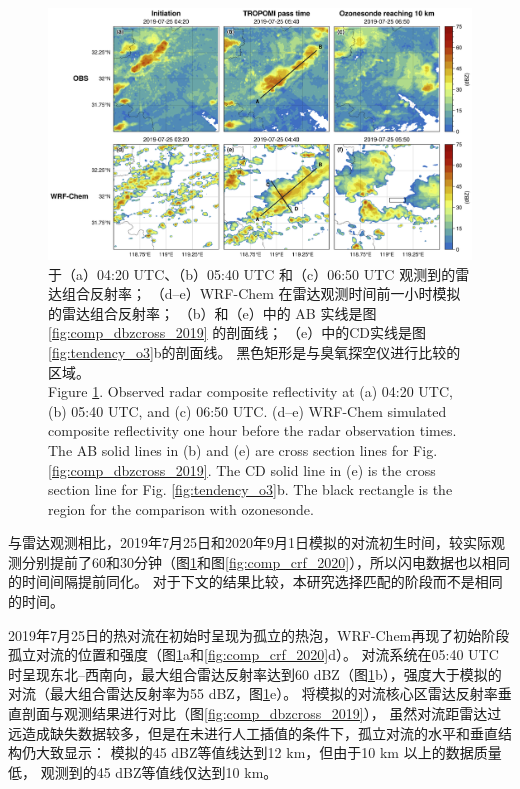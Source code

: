 \begin{figure}[H]
\centering
\includegraphics[width=\textwidth]{./figures/comp_crf_2019.png}
\caption{于（a）04:20 UTC、（b）05:40 UTC 和（c）06:50 UTC 观测到的雷达组合反射率；
         （d--e）WRF-Chem 在雷达观测时间前一小时模拟的雷达组合反射率；
         （b）和（e）中的 AB 实线是图 \ref{fig:comp_dbzcross_2019} 的剖面线；
         （e）中的CD实线是图\ref{fig:tendency_o3}b的剖面线。
         黑色矩形是与臭氧探空仪进行比较的区域。\\
         Figure \ref{fig:comp_crf_2019}. Observed radar composite reflectivity at (a) 04:20 UTC, (b) 05:40 UTC, and (c) 06:50 UTC.
        (d--e) WRF-Chem simulated composite reflectivity one hour before the radar observation times.
        The AB solid lines in (b) and (e) are cross section lines for Fig. \ref{fig:comp_dbzcross_2019}.
        The CD solid line in (e) is the cross section line for Fig. \ref{fig:tendency_o3}b.
        The black rectangle is the region for the comparison with ozonesonde.}
\label{fig:comp_crf_2019}
\end{figure}


与雷达观测相比，2019年7月25日和2020年9月1日模拟的对流初生时间，较实际观测分别提前了60和30分钟（图\ref{fig:comp_crf_2019}和图\ref{fig:comp_crf_2020}），所以闪电数据也以相同的时间间隔提前同化。
对于下文的结果比较，本研究选择匹配的阶段而不是相同的时间。

2019年7月25日的热对流在初始时呈现为孤立的热泡，WRF-Chem再现了初始阶段孤立对流的位置和强度（图\ref{fig:comp_crf_2019}a和\ref{fig:comp_crf_2020}d）。
对流系统在05:40 UTC时呈现东北--西南向，最大组合雷达反射率达到60 dBZ（图\ref{fig:comp_crf_2019}b），强度大于模拟的对流（最大组合雷达反射率为55 dBZ，图\ref{fig:comp_crf_2019}e）。
将模拟的对流核心区雷达反射率垂直剖面与观测结果进行对比（图\ref{fig:comp_dbzcross_2019}），
虽然对流距雷达过远造成缺失数据较多，但是在未进行人工插值的条件下，孤立对流的水平和垂直结构仍大致显示：
模拟的45 dBZ等值线达到12 km，但由于10 km 以上的数据质量低，
观测到的45 dBZ等值线仅达到10 km。

